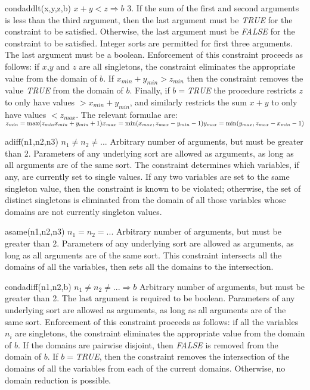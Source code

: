     {condaddlt(x,y,z,b)}
    {$x+y<z \Rightarrow b$}
    {3.  If the sum of the first and second arguments 
    is less than the third argument, then the last
    argument must be {\em TRUE} for the constraint to be satisfied.
    Otherwise, the last argument must be {\em FALSE} for the constraint
    to be satisfied.}
    {Integer sorts are permitted for first three arguments. The last argument must be a boolean.}
    {Enforcement of this constraint proceeds as follows: if $x$,$y$ and $z$ are all 
    singletons, the constraint eliminates the appropriate value from the
    domain of $b$.
    If $x_{min}+y_{min}>z_{min}$ then the constraint removes the value {\em TRUE} from the domain
    of $b$.  Finally, if $b=${\em TRUE}
    the procedure restricts $z$ to only have values $>x_{min}+y_{min}$,
    and similarly restricts the sum $x+y$ to only have values $<z_{max}$.  
    The relevant formulae are:
    $z_{min} = \max(z_{min}x_{min}+y_{min}+1)\\
    x_{max} = \min(x_{max},z_{max}-y_{min}-1)\\
    y_{max} = \min(y_{max},z_{max}-x_{min}-1)$}


    {adiff(n1,n2,n3)}
    {$n_1 \neq n_2 \neq ...$}
    {Arbitrary number of arguments, but must be greater than 2.}
    {Parameters of any underlying sort are allowed as arguments, as long as all arguments
    are of the same sort.}
    {The constraint determines which variables, if any, are currently set to
    single values.  If any two variables are set to the same singleton value,
    then the constraint is known to be violated; otherwise, the set of distinct
    singletons is eliminated from the domain of all those variables whose
    domains are not currently singleton values.}

    {asame(n1,n2,n3)}
    {$n_1 = n_2 = ...$}
    {Arbitrary number of arguments, but must be greater than 2.}
    {Parameters of any underlying sort are allowed as arguments, as long as all arguments
    are of the same sort.}
    {This constraint intersects all the domains
    of all the variables, then sets all the domains to the intersection.}

    {condadiff(n1,n2,b)}
    {$n_1 \neq n_2 \neq ...\Rightarrow b$}
    {Arbitrary number of arguments, but must be greater than 2.  The last argument is required to be boolean.}
    {Parameters of any underlying sort are allowed as arguments, as long as all arguments
    are of the same sort.}
    {Enforcement of this constraint proceeds as follows: if all the variables $n_i$
    are singletons, the constraint eliminates the appropriate value from the
    domain of $b$.  If the domains are pairwise 
    disjoint, then {\em FALSE} is removed from the domain of $b$.
    If $b=${\em TRUE}, then
    the constraint removes the intersection of the domains of all the variables from
    each of the current domains.  Otherwise, no domain reduction is possible.}

